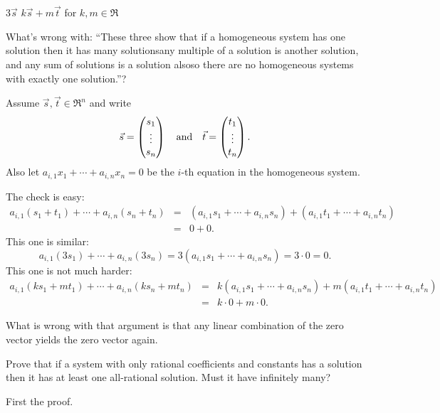 \begin{exercises}
\begin{exparts*}
      \partsitem \( 3\vec{s} \)
      \partsitem \( k\vec{s}+m\vec{t} \) for \( k,m\in\Re \)
    \end{exparts*}
    What's wrong with: ``These three show that if a homogeneous
    system has one solution then it has many solutions\Dash any multiple of 
    a solution is another solution, and any sum of solutions is a solution
    also\Dash so there are no
    homogeneous systems with exactly one solution.''?
    \begin{answer}
      Assume \( \vec{s},\vec{t}\in\Re^n \) and write
      \begin{equation*}
        \vec{s}=\begin{pmatrix} s_1 \\ \vdots \\ s_n \end{pmatrix}
          \quad\mbox{and}\quad
        \vec{t}=\begin{pmatrix} t_1 \\ \vdots \\ t_n \end{pmatrix}.
      \end{equation*}
      Also let \( a_{i,1}x_1+\cdots+a_{i,n}x_n=0 \) be the \( i \)-th equation
      in the homogeneous system.
      \begin{exparts}
        \partsitem The check is easy:
          \begin{eqnarray*}
            a_{i,1}(s_1+t_1)+\cdots+a_{i,n}(s_n+t_n)
            &=
            &(a_{i,1}s_1+\cdots+a_{i,n}s_n)
            +(a_{i,1}t_1+\cdots+a_{i,n}t_n)         \\
            &=
            &0+0.
          \end{eqnarray*}
        \partsitem This one is similar:
          \begin{equation*}
            a_{i,1}(3s_1)+\cdots+a_{i,n}(3s_n)
            =3(a_{i,1}s_1+\cdots+a_{i,n}s_n)
            =3\cdot 0=0.
          \end{equation*}
        \partsitem This one is not much harder:
          \begin{eqnarray*}
            a_{i,1}(ks_1+mt_1)+\cdots+a_{i,n}(ks_n+mt_n)
            &=
            &k(a_{i,1}s_1+\cdots+a_{i,n}s_n)
            +m(a_{i,1}t_1+\cdots+a_{i,n}t_n)         \\
            &=
            &k\cdot 0+m\cdot 0.
          \end{eqnarray*}
      \end{exparts}  
     What is wrong with that argument is that any linear combination of the 
     zero vector yields the zero vector again.
   \end{answer}
  \item
    Prove that if a system with only rational coefficients
    and constants
    has a solution then it has at least one all-rational solution.
    Must it have infinitely many?
    \begin{answer}
      First the proof.


\end{answer}
\end{exercises}
